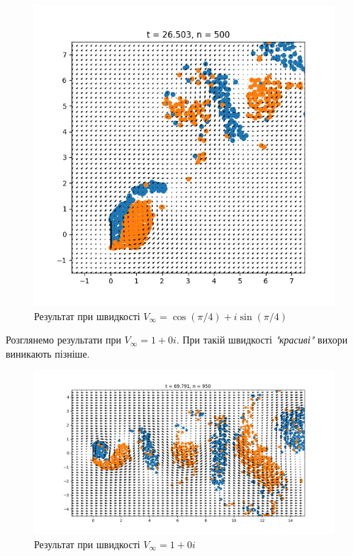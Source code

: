 \documentclass[a4paper,12pt]{article}
\begin{document}
		\begin{figure}[ht]
			\begin{center}\includegraphics[scale=0.5]{result_plate1} \end{center}
			\caption{Результат при швидкості $V_{\infty} = \cos(\pi/4) + i\sin(\pi/4)$}
			\label{fig:result_plate1}
		\end{figure}

		Розглянемо результати при $V_{\infty} = 1 + 0i$. При такій швидкості \textit{"красиві"} вихори виникають пізніше.
		
		\begin{figure}[ht]
			\begin{center}\includegraphics[scale=0.5]{result_plate2} \end{center}
			\caption{Результат при швидкості $V_{\infty} = 1 +0i$}
			\label{fig:result_plate2}
		\end{figure}
	
\end{document}
